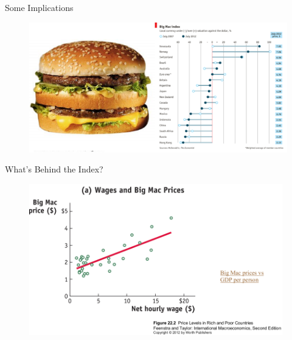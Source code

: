 \documentclass[10pt,hyperref={CJKbookmarks=true},xcolor=dvipsnames,aspectratio=169]{beamer}
\begin{document}
\begin{frame}{Some Implications }


\begin{figure}


\begin{centering}
\includegraphics[width=12cm]{fig/ricardo/lec3-17}
\par\end{centering}

\end{figure}

\end{frame}

\begin{frame}{What’s Behind the Index? }


\begin{figure}
\begin{centering}
\includegraphics[width=11cm]{fig/ricardo/lec3-18}
\par\end{centering}

\end{figure}

\end{frame}
\end{document}
